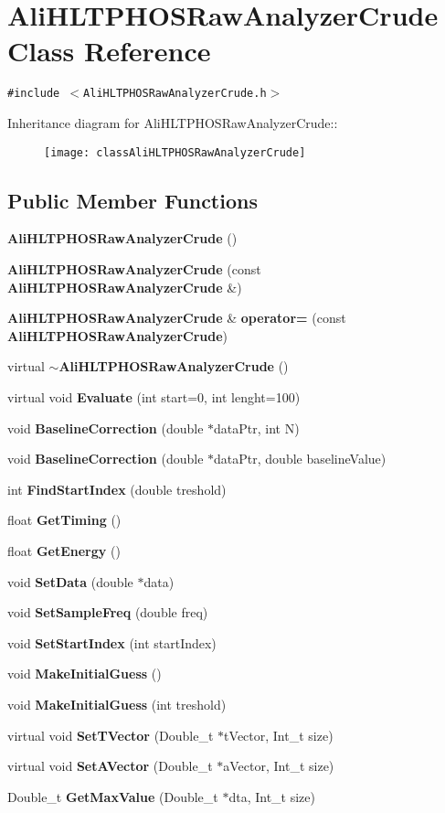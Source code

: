 \section{Ali\-HLTPHOSRaw\-Analyzer\-Crude Class Reference}
\label{classAliHLTPHOSRawAnalyzerCrude}
{\tt \#include $<$Ali\-HLTPHOSRaw\-Analyzer\-Crude.h$>$}

Inheritance diagram for Ali\-HLTPHOSRaw\-Analyzer\-Crude::\begin{figure}[H]
\begin{center}
\leavevmode
\texttt{[image: classAliHLTPHOSRawAnalyzerCrude]}
\end{center}
\end{figure}
\subsection*{Public Member Functions}
\begin{CompactItemize}
\item 
{\bf Ali\-HLTPHOSRaw\-Analyzer\-Crude} ()
\item 
{\bf Ali\-HLTPHOSRaw\-Analyzer\-Crude} (const {\bf Ali\-HLTPHOSRaw\-Analyzer\-Crude} \&)
\item 
{\bf Ali\-HLTPHOSRaw\-Analyzer\-Crude} \& {\bf operator=} (const {\bf Ali\-HLTPHOSRaw\-Analyzer\-Crude})
\item 
virtual {\bf $\sim$Ali\-HLTPHOSRaw\-Analyzer\-Crude} ()
\item 
virtual void {\bf Evaluate} (int start=0, int lenght=100)
\item 
void {\bf Baseline\-Correction} (double $\ast$data\-Ptr, int N)
\item 
void {\bf Baseline\-Correction} (double $\ast$data\-Ptr, double baseline\-Value)
\item 
int {\bf Find\-Start\-Index} (double treshold)
\item 
float {\bf Get\-Timing} ()
\item 
float {\bf Get\-Energy} ()
\item 
void {\bf Set\-Data} (double $\ast$data)
\item 
void {\bf Set\-Sample\-Freq} (double freq)
\item 
void {\bf Set\-Start\-Index} (int start\-Index)
\item 
void {\bf Make\-Initial\-Guess} ()
\item 
void {\bf Make\-Initial\-Guess} (int treshold)
\item 
virtual void {\bf Set\-TVector} (Double\_\-t $\ast$t\-Vector, Int\_\-t size)
\item 
virtual void {\bf Set\-AVector} (Double\_\-t $\ast$a\-Vector, Int\_\-t size)
\item 
Double\_\-t {\bf Get\-Max\-Value} (Double\_\-t $\ast$dta, Int\_\-t size)
\end{CompactItemize}

